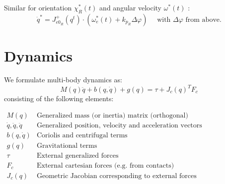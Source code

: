 \documentclass[fontsize=6pt,DIV=calc,a4paper,ngerman]{scrartcl}
\begin{document}
\begin{multicols*}{4}
	Similar for orientation $\chi_R^*(t)$ and angular velocity $\omega^*(t)$ :
	$$\dot{q}^*= J_{e0_R}^+(q^t)\cdot (\omega_e^*(t) + k_{p_R}\Delta\varphi) \quad \text{ with } \Delta\varphi \text{ from above.}$$


	\section{Dynamics}
	We formulate multi-body dynamics as:
	$$M(q)\ddot{q}+b(q,\dot{q})+g(q) = \tau + J_c(q)^T F_c$$
	consisting of the following elements:
	\begin{center}
		$\begin{array}{r|l}
				M(q)                      & \text{Generalized mass (or inertia) matrix (orthogonal)}       \\
				\dot{q},\ddot{q},\ddot{q} & \text{Generalized position, velocity and acceleration vectors} \\
				b(q,\dot{q})              & \text{Coriolis and centrifugal terms}                          \\
				g(q)                      & \text{Gravitational terms}                                     \\
				\tau                      & \text{External generalized forces}                             \\
				F_c                       & \text{External cartesian forces (e.g. from contacts)}          \\
				J_c(q)                    & \text{Geometric Jacobian corresponding to external forces}
			\end{array}$

	\end{center}


\end{multicols*}
\end{document}
